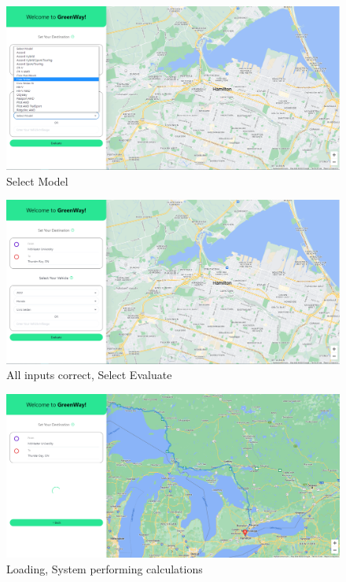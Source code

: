 \documentclass[12pt, titlepage]{article}
\begin{document}
\begin{figure}[h!]
    \centering
    \includegraphics[scale=0.36]{select-model.PNG}
    \caption{Select Model}
\end{figure}
\begin{figure}[h!]
    \centering
    \includegraphics[scale=0.36]{correct-input.PNG}
    \caption{All inputs correct, Select Evaluate}
\end{figure}
\begin{figure}[h!]
    \centering
    \includegraphics[scale=0.36]{loading.PNG}
    \caption{Loading, System performing calculations}
\end{figure}
\end{document}
